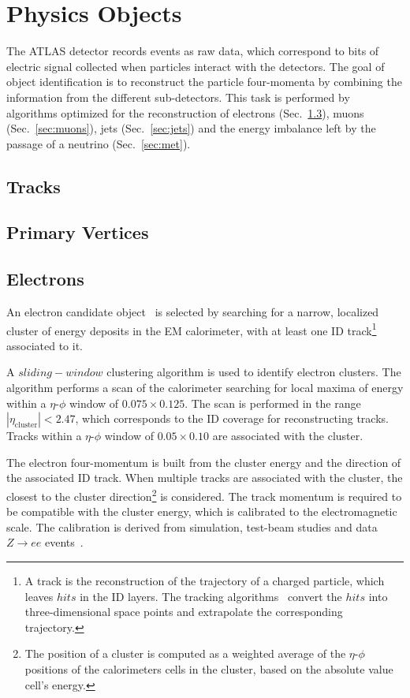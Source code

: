 \chapter{Physics Objects}
\label{sec:objects}

The ATLAS detector records events as raw data, 
which correspond to bits of electric signal collected 
when particles interact with the detectors. 
The goal of object identification is to reconstruct the particle four-momenta
by combining the information from the different sub-detectors.
This task is performed by algorithms optimized for the reconstruction of
electrons (Sec.~\ref{sec:electrons}), muons (Sec.~\ref{sec:muons}), 
jets (Sec.~\ref{sec:jets}) and the energy imbalance left
by the passage of a neutrino (Sec.~\ref{sec:met}).

\section{Tracks}
\label{sec:tracks}

\section{Primary Vertices}
\label{sec:pv}

\section{Electrons}
\label{sec:electrons}

An electron candidate object~\cite{elereco} is selected by searching 
for a narrow, 
localized cluster of energy deposits in the EM calorimeter, 
with at least one ID track\footnote{A track is the reconstruction 
of the trajectory of a charged particle, which leaves $hits$ in the 
ID layers. The tracking algorithms~\cite{trackalgos} convert the 
$hits$ into three-dimensional space points and extrapolate the 
corresponding trajectory.}
associated to it.

A $sliding-window$ clustering algorithm is used to identify electron 
clusters. The algorithm performs a scan of the calorimeter searching 
for local maxima of energy
within a $\eta$-$\phi$ window of $0.075\times{}0.125$.
The scan is performed in the range $|\eta_{\mathrm{cluster}}|<2.47$, 
which corresponds to the ID coverage for reconstructing tracks. 
Tracks within a $\eta$-$\phi$ window of $0.05\times{}0.10$ are 
associated with the cluster.

The electron four-momentum is built from the cluster energy
and the direction of the associated ID track.
When multiple tracks are associated with the cluster, the closest
to the cluster direction\footnote{The position of a cluster 
is computed as a weighted average of the $\eta$-$\phi$ positions 
of the calorimeters cells in the cluster, based on the absolute 
value cell's energy.} is considered.
The track momentum is required to be compatible with the cluster energy,
which is calibrated to the electromagnetic scale. The calibration is
derived from simulation, test-beam studies and data $Z\to ee$ 
events~\cite{elecalib}.

